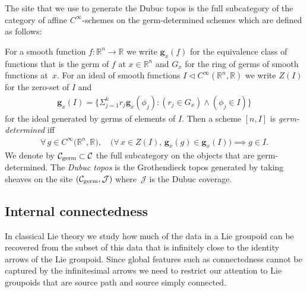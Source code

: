 \documentclass[10pt,a4paper]{amsart}
\numberwithin{equation}{section}
\begin{document}
The site that we use to generate the Dubuc topos is the full subcategory of the category of af\/f\/ine $C^{\infty}$-schemes on the germ-determined schemes which are def\/ined as follows:
\begin{Definition}\label{def:germ-determined-ideal}
For a smooth function $f\colon \mathbb{R}^{n}\rightarrow \mathbb{R}$ we write $\mathbf{g}_{x}(f)$ for the equivalence class of functions that is the germ of $f$ at $x\in\mathbb{R}^{n}$ and $G_{x}$ for the ring of germs of smooth functions at~$x$. For an ideal of smooth functions $I\triangleleft C^{\infty}(\mathbb{R}^{n},\mathbb{R})$ we write $Z(I)$ for the zero-set of $I$ and
\begin{gather*}\mathbf{g}_{x}(I)=\big\{\Sigma_{j=1}^{k}r_{j}\mathbf{g}_{x}(\phi_{j})\colon (r_{j}\in G_{x})\wedge(\phi_{j}\in I)\big\}\end{gather*}
for the ideal generated by germs of elements of $I$. Then a scheme $[n,I]$ is \emph{germ-determined} if\/f
\begin{gather*}\forall\, g\in C^{\infty}\big(\mathbb{R}^n,\mathbb{R}\big), \quad \big(\forall\, x\in Z(I), \, \mathbf{g}_{x}(g)\in \mathbf{g}_{x}(I)\big)\implies g\in I.\end{gather*}
We denote by $\mathcal{C}_{\rm germ}\subset \mathcal{C}$ the full subcategory on the objects that are germ-determined. The \emph{Dubuc topos} is the Grothendieck topos generated by taking sheaves on the site $(\mathcal{C}_{\rm germ},\mathcal{J})$ where~$\mathcal{J}$ is the Dubuc coverage.
\end{Definition}

\subsection{Internal connectedness}\label{sec:enriched-connectedness}

In classical Lie theory we study how much of the data in a Lie groupoid can be recovered from the subset of this data that is inf\/initely close to the identity arrows of the Lie groupoid. Since global features such as connectedness cannot be captured by the inf\/initesimal arrows we need to restrict our attention to Lie groupoids that are source path and source simply connected.
\end{document}
